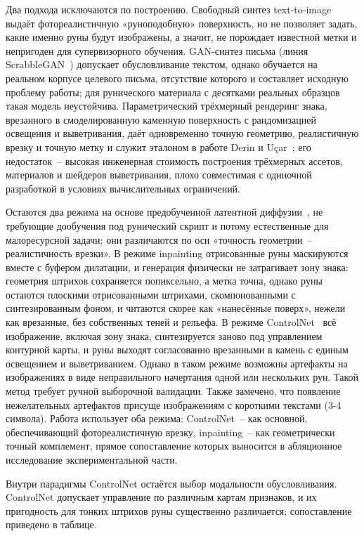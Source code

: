 \documentclass[a4paper,12pt]{extarticle}
\begin{document}
Два подхода исключаются по построению. Свободный синтез text-to-image выдаёт фотореалистичную «руноподобную» поверхность, но не позволяет задать, какие именно руны будут изображены, а значит, не порождает известной метки и непригоден для супервизорного обучения. GAN-синтез письма (линия ScrabbleGAN~\cite{fogel2020scrabblegan}) допускает обусловливание текстом, однако обучается на реальном корпусе целевого письма, отсутствие которого и составляет исходную проблему работы; для рунического материала с десятками реальных образцов такая модель неустойчива. Параметрический трёхмерный рендеринг знака, врезанного в смоделированную каменную поверхность с рандомизацией освещения и выветривания, даёт одновременно точную геометрию, реалистичную врезку и точную метку и служит эталоном в работе Derin и Uçar~\cite{derin2024}; его недостаток~-- высокая инженерная стоимость построения трёхмерных ассетов, материалов и шейдеров выветривания, плохо совместимая с одиночной разработкой в условиях вычислительных ограничений.
 
Остаются два режима на основе предобученной латентной диффузии~\cite{rombach2022ldm}, не требующие дообучения под рунический скрипт и потому естественные для малоресурсной задачи; они различаются по оси «точность геометрии~-- реалистичность врезки». В режиме inpainting отрисованные руны маскируются вместе с буфером дилатации, и генерация физически не затрагивает зону знака: геометрия штрихов сохраняется попиксельно, а метка точна, однако руны остаются плоскими отрисованными штрихами, скомпонованными с синтезированным фоном, и читаются скорее как «нанесённые поверх», нежели как врезанные, без собственных теней и рельефа. В режиме ControlNet~\cite{zhang2023controlnet} всё изображение, включая зону знака, синтезируется заново под управлением контурной карты, и руны выходят согласованно врезанными в камень с единым освещением и выветриванием. Однако в таком режиме возможны артефакты на изображениях в виде неправильного начертания одной или нескольких рун. Такой метод требует ручной выборочной валидации. Также замечено, что появление нежелательных артефактов присуще изображениям с короткими текстами (3-4 символа). Работа использует оба режима: ControlNet~-- как основной, обеспечивающий фотореалистичную врезку, inpainting~-- как геометрически точный комплемент, прямое сопоставление которых выносится в абляционное исследование экспериментальной части.
 
Внутри парадигмы ControlNet остаётся выбор модальности обусловливания. ControlNet допускает управление по различным картам признаков, и их пригодность для тонких штрихов руны существенно различается; сопоставление приведено в таблице.
 
\end{document}
